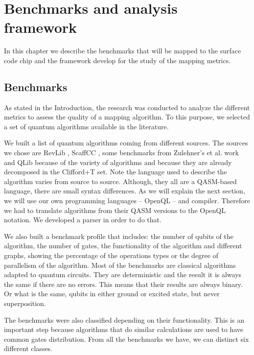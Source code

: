 
\chapter*{Benchmarks and analysis framework}
\label{sec:orge2afc1b}

In this chapter we describe the benchmarks that will be mapped to the surface code chip and the framework develop for the study of the mapping metrics.

\section*{Benchmarks}
\label{sec:org7aebf47}
As stated in the Introduction, the research was conducted to analyze the different metrics to assess the quality of a mapping algorithm.
To this purpose, we selected a set of quantum algorithms available in the literature.

We built a list of quantum algorithms coming from different sources.
The sources we chose are RevLib \cite{Wille_2008}, ScaffCC \cite{JavadiAbhari_2015}, some benchmarks from Zulehner's et al. work \cite{zulehner17:effic_method_mappin_quant_circuit} and QLib \cite{Lin_2014} because of the variety of algorithms and because they are already decomposed in the Clifford+T set.
Note the language used to describe the algorithm varies from source to source.
Although, they all are a QASM-based language, there are small syntax differences.
As we will explain the next section, we will use our own programming languages -- OpenQL -- and compiler.
Therefore we had to translate algorithms from their QASM versions to the OpenQL notation.
We developed a parser in order to do that.

We also built a benchmark profile that includes: the number of qubits of the algorithm, the number of gates, the functionality of the algorithm and different graphs, showing the percentage of the operations types or the degree of parallelism of the algorithm.
Most of the benchmarks are classical algorithms adapted to quantum circuits.
They are deterministic and the result it is always the same if there are no errors.
This means that their results are always binary.
Or what is the same, qubits in either ground or excited state, but never superposition.


The benchmarks were also classified depending on their functionality.
This is an important step because algorithms that do similar calculations are used to have common gates distribution.
From all the benchmarks we have, we can distinct six different classes.

